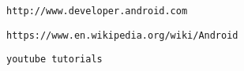 \begin{thebibliography}{99}

	\normalsize
	
	
	
	\bibitem{} {}
	\texttt{http://www.developer.android.com}

     \bibitem{}	{}
	 \texttt{https://www.en.wikipedia.org/wiki/Android}
	 
	 
	 \bibitem{}{}
	 \texttt{youtube tutorials}
	 
	 
\end{thebibliography}
